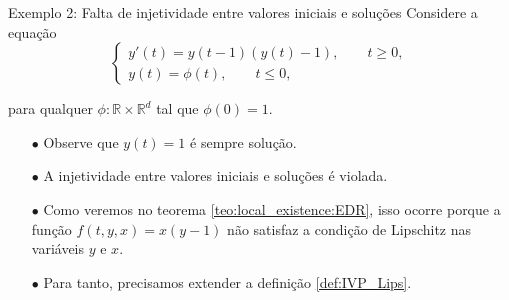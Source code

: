 \documentclass{beamer}
\newcommand{\R}{\mathbb{R}}
\theoremstyle{plain}
\theoremstyle{definition}
\begin{document}
%
%      
%
%
%




\begin{frame}{Exemplo 2: Falta de injetividade entre valores iniciais e soluções}
        Considere a equação
        \begin{equation}
            \begin{cases}
                y'(t) = y(t - 1) (y(t) - 1), \qquad t \geq 0, \\
                y(t) = \phi(t), \qquad t \leq 0,
            \end{cases}
            \label{chap1:ex2:eq:1}
        \end{equation}

        para qualquer $\phi: \R \times \R^d$ tal que $\phi(0) = 1$. 

        \begin{itemize}
            \item[$\bullet$] Observe que $y(t) = 1$ é sempre solução.
            \item[$\bullet$] A injetividade entre valores iniciais e soluções é violada. 
            \item[$\bullet$] Como veremos no teorema \ref{teo:local_existence:EDR}, isso ocorre porque a função $f(t, y, x) = x(y - 1)$ não satisfaz a condição de Lipschitz nas variáveis $y$ e $x$. 
            \item[$\bullet$] Para tanto, precisamos extender a definição \ref{def:IVP_Lips}.
        \end{itemize} 


\end{frame}

\end{document}

